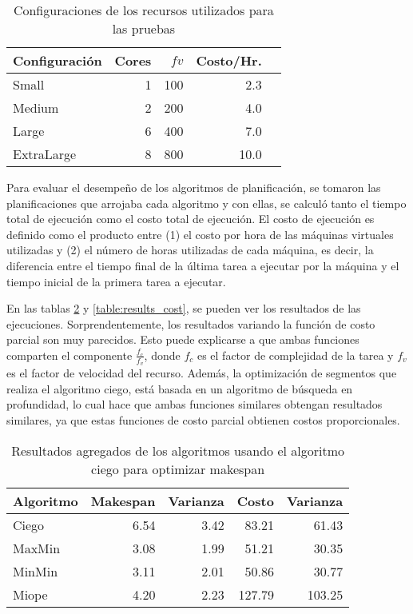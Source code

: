 \begin{table}[ht]
\centering
\begin{tabular}{lrrrr}
  \hline
Configuraci\'on & Cores & $fv$ & Costo/Hr. \\ 
  \hline
  Small & 1 & 100 & 2.3 \\ 
  Medium & 2 & 200 & 4.0 \\ 
  Large & 6 & 400 & 7.0 \\ 
  ExtraLarge & 8 & 800 & 10.0 \\ 
   \hline
\end{tabular}
\caption{Configuraciones de los recursos utilizados para las pruebas} 
\label{table:resource_configurations}
\end{table}

Para evaluar el desempeño de los algoritmos de planificación, se tomaron las planificaciones que arrojaba cada algoritmo y con ellas, se calculó tanto el tiempo total de ejecución como el costo total de ejecución. El costo de ejecución es definido como el producto entre (1) el costo por hora de las máquinas virtuales utilizadas y (2) el número de horas utilizadas de cada máquina, es decir, la diferencia entre el tiempo final de la última tarea a ejecutar por la máquina y el tiempo inicial de la primera tarea a ejecutar.

En las tablas \ref{table:results_makespan} y \ref{table:results_cost}, se pueden ver los resultados de las ejecuciones. Sorprendentemente, los resultados variando la funci\'on de costo parcial son muy parecidos. Esto puede explicarse a que ambas funciones comparten el componente $\frac{f_c}{f_v}$, donde $f_c$ es el factor de complejidad de la tarea y $f_v$ es el factor de velocidad del recurso. Además, la optimización de segmentos que realiza el algoritmo ciego, está basada en un algoritmo de búsqueda en profundidad, lo cual hace que ambas funciones similares obtengan resultados similares, ya que estas funciones de costo parcial obtienen costos proporcionales.


\begin{table}[ht]
\centering
\begin{tabular}{lrrrr}
  \hline
Algoritmo & Makespan & Varianza & Costo & Varianza \\ 
  \hline
  Ciego & 6.54 & 3.42 & 83.21 & 61.43 \\ 
  MaxMin & 3.08 & 1.99 & 51.21 & 30.35 \\ 
  MinMin & 3.11 & 2.01 & 50.86 & 30.77 \\ 
  Miope & 4.20 & 2.23 & 127.79 & 103.25 \\ 
  \hline
\end{tabular}
\caption{Resultados agregados de los algoritmos usando el algoritmo ciego para optimizar makespan} 
\label{table:results_makespan}
\end{table}


